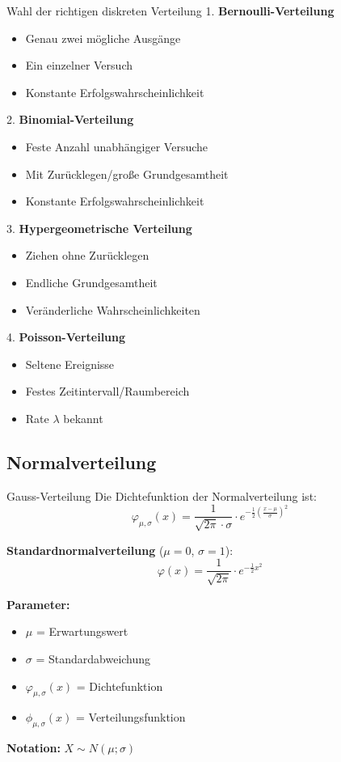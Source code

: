 \begin{KR}{Wahl der richtigen diskreten Verteilung}
1. \textbf{Bernoulli-Verteilung}
   \begin{itemize}
   \item Genau zwei mögliche Ausgänge
   \item Ein einzelner Versuch
   \item Konstante Erfolgswahrscheinlichkeit
   \end{itemize}

2. \textbf{Binomial-Verteilung}
   \begin{itemize}
   \item Feste Anzahl unabhängiger Versuche
   \item Mit Zurücklegen/große Grundgesamtheit
   \item Konstante Erfolgswahrscheinlichkeit
   \end{itemize}

3. \textbf{Hypergeometrische Verteilung}
   \begin{itemize}
   \item Ziehen ohne Zurücklegen
   \item Endliche Grundgesamtheit
   \item Veränderliche Wahrscheinlichkeiten
   \end{itemize}

4. \textbf{Poisson-Verteilung}
   \begin{itemize}
   \item Seltene Ereignisse
   \item Festes Zeitintervall/Raumbereich
   \item Rate $\lambda$ bekannt
   \end{itemize}
\end{KR}

\subsection{Normalverteilung}

\begin{definition}{Gauss-Verteilung}
Die Dichtefunktion der Normalverteilung ist:
$$\varphi_{\mu,\sigma}(x)=\frac{1}{\sqrt{2\pi} \cdot \sigma} \cdot e^{-\frac{1}{2}(\frac{x-\mu}{\sigma})^2}$$

\textbf{Standardnormalverteilung} ($\mu=0$, $\sigma=1$):
$$\varphi(x)=\frac{1}{\sqrt{2\pi}} \cdot e^{-\frac{1}{2}x^2}$$

\textbf{Parameter:}
\begin{itemize}
    \item $\mu$ = Erwartungswert
    \item $\sigma$ = Standardabweichung
    \item $\varphi_{\mu,\sigma}(x)$ = Dichtefunktion
    \item $\phi_{\mu,\sigma}(x)$ = Verteilungsfunktion
\end{itemize}

\textbf{Notation:} $X \sim N(\mu;\sigma)$
\end{definition}

